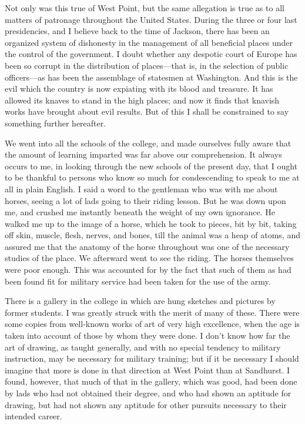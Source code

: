 Not only was this true of West Point, but the same allegation is
true as to all matters of patronage throughout the United States.
During the three or four last presidencies, and I believe back to
the time of Jackson, there has been an organized system of
dishonesty in the management of all beneficial places under the
control of the government.  I doubt whether any despotic court of
Europe has been so corrupt in the distribution of places---that is,
in the selection of public officers---as has been the assemblage of
statesmen at Washington.  And this is the evil which the country is
now expiating with its blood and treasure.  It has allowed its
knaves to stand in the high places; and now it finds that knavish
works have brought about evil results.  But of this I shall be
constrained to say something further hereafter.

We went into all the schools of the college, and made ourselves
fully aware that the amount of learning imparted was far above our
comprehension.  It always occurs to me, in looking through the new
schools of the present day, that I ought to be thankful to persons
who know so much for condescending to speak to me at all in plain
English.  I said a word to the gentleman who was with me about
horses, seeing a lot of lads going to their riding lesson.  But he
was down upon me, and crushed me instantly beneath the weight of my
own ignorance.  He walked me up to the image of a horse, which he
took to pieces, bit by bit, taking off skin, muscle, flesh, nerves,
and bones, till the animal was a heap of atoms, and assured me that
the anatomy of the horse throughout was one of the necessary
studies of the place.  We afterward went to see the riding.  The
horses themselves were poor enough.  This was accounted for by the
fact that such of them as had been found fit for military service
had been taken for the use of the army.

There is a gallery in the college in which are hung sketches and
pictures by former students.  I was greatly struck with the merit
of many of these.  There were some copies from well-known works of
art of very high excellence, when the age is taken into account of
those by whom they were done.  I don't know how far the art of
drawing, as taught generally, and with no special tendency to
military instruction, may be necessary for military training; but
if it be necessary I should imagine that more is done in that
direction at West Point than at Sandhurst.  I found, however, that
much of that in the gallery, which was good, had been done by lads
who had not obtained their degree, and who had shown an aptitude
for drawing, but had not shown any aptitude for other pursuits
necessary to their intended career.

